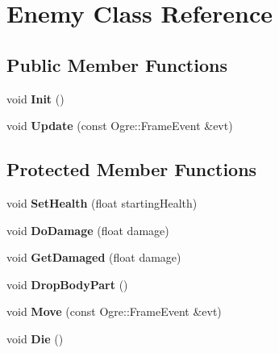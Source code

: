\hypertarget{class_enemy}{}\section{Enemy Class Reference}
\label{class_enemy}
\subsection*{Public Member Functions}
\begin{DoxyCompactItemize}
\item 
\hypertarget{class_enemy_aa01a1c40c682cc7c36995f26533bcb56}{}void {\bfseries Init} ()\label{class_enemy_aa01a1c40c682cc7c36995f26533bcb56}

\item 
\hypertarget{class_enemy_ac11be3c2efb392b691fd4ac47320de74}{}void {\bfseries Update} (const Ogre\+::\+Frame\+Event \&evt)\label{class_enemy_ac11be3c2efb392b691fd4ac47320de74}

\end{DoxyCompactItemize}
\subsection*{Protected Member Functions}
\begin{DoxyCompactItemize}
\item 
\hypertarget{class_enemy_af6977720946a9c6f62031cbce4d82bdd}{}void {\bfseries Set\+Health} (float starting\+Health)\label{class_enemy_af6977720946a9c6f62031cbce4d82bdd}

\item 
\hypertarget{class_enemy_ad47b1156506daa899f6d16638c9b14a5}{}void {\bfseries Do\+Damage} (float damage)\label{class_enemy_ad47b1156506daa899f6d16638c9b14a5}

\item 
\hypertarget{class_enemy_ad7aefcf2fc079853825d992376af71ce}{}void {\bfseries Get\+Damaged} (float damage)\label{class_enemy_ad7aefcf2fc079853825d992376af71ce}

\item 
\hypertarget{class_enemy_aee058a47ea012223067681ca9f706447}{}void {\bfseries Drop\+Body\+Part} ()\label{class_enemy_aee058a47ea012223067681ca9f706447}

\item 
\hypertarget{class_enemy_afb67a4ac166854b0f06e3c53a5ef40d2}{}void {\bfseries Move} (const Ogre\+::\+Frame\+Event \&evt)\label{class_enemy_afb67a4ac166854b0f06e3c53a5ef40d2}

\item 
\hypertarget{class_enemy_a1cfd85c8c7cac6f389f98484ba10b329}{}void {\bfseries Die} ()\label{class_enemy_a1cfd85c8c7cac6f389f98484ba10b329}

\end{DoxyCompactItemize}
